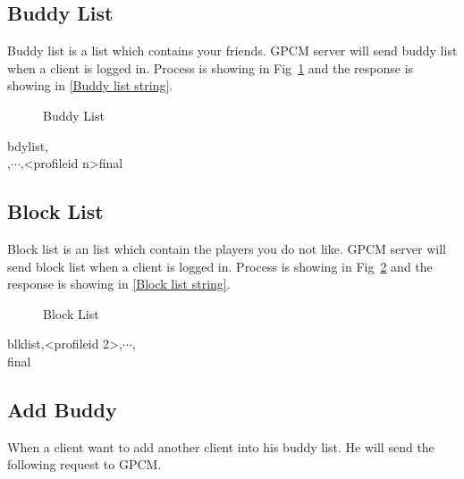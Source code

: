 \documentclass[oneside,titlepage,a4paper]{Definition/retrospy} %
\begin{document}
\subsection{Buddy List}
Buddy list is a list which contains your friends.
GPCM server will send buddy list when a client is logged in. Process is showing in Fig~\ref{Buddy List} and the response is showing in \ref{Buddy list string}.
\begin{figure}[H]
	\centering
	\caption{Buddy List}
	\label{Buddy List}
\end{figure}

\ServerResponse

\begin{mybox}
	\label{Buddy list string}
	\tbs bdy\tbs<number of profileid>\tbs list\tbs<profileid 1>,
	\\<profileid 2>,$ \cdots $,<profileid n>\tbs final\tbs
\end{mybox}


\subsection{Block List}
Block list is an list which contain the players you do not like.
GPCM server will send block list when a client is logged in. Process is showing in Fig~\ref{Block List} and the response is showing in \ref{Block list string}.
\begin{figure}[H]
	\centering
	\caption{Block List}
	\label{Block List}
\end{figure}

\ServerResponse

\begin{mybox}[label=Block list string]
\tbs blk\tbs list,<profileid 2>,$ \cdots $,\\<profileid n>\tbs final\tbs
\end{mybox}

\subsection{Add Buddy}
When a client want to add another client into his buddy list. He will send the following request to GPCM.
\end{document}
